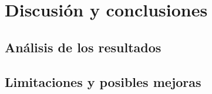 
\chapter{Discusión y conclusiones}
\section{Análisis de los resultados}

\section{Limitaciones y posibles mejoras}


